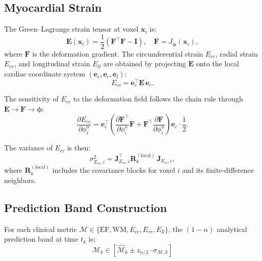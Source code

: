 \documentclass[10pt,twocolumn]{article}
\begin{document}
\subsection{Myocardial Strain}

The Green--Lagrange strain tensor at voxel $\bm{x}_i$ is:
\begin{equation}
    \bm{E}(\bm{x}_i) = \frac{1}{2}\left(\bm{F}^\top \bm{F} - \bm{I}\right), \quad \bm{F} = J_{\bm{\phi}}(\bm{x}_i),
    \label{eq:strain_def}
\end{equation}
where $\bm{F}$ is the deformation gradient. The circumferential strain $E_{cc}$, radial strain $E_{rr}$, and longitudinal strain $E_{ll}$ are obtained by projecting $\bm{E}$ onto the local cardiac coordinate system $(\bm{e}_c, \bm{e}_r, \bm{e}_l)$:
\begin{equation}
    E_{cc} = \bm{e}_c^\top \bm{E} \, \bm{e}_c.
    \label{eq:circ_strain}
\end{equation}

The sensitivity of $E_{cc}$ to the deformation field follows the chain rule through $\bm{E} \to \bm{F} \to \bm{\phi}$:
\begin{equation}
    \frac{\partial E_{cc}}{\partial \phi^a_i} = \bm{e}_c^\top \left(\frac{\partial \bm{F}^\top}{\partial \phi^a_i}\bm{F} + \bm{F}^\top \frac{\partial \bm{F}}{\partial \phi^a_i}\right) \bm{e}_c \cdot \frac{1}{2}.
    \label{eq:strain_sensitivity}
\end{equation}

The variance of $E_{cc}$ is then:
\begin{equation}
    \sigma^2_{E_{cc},i} = \bm{J}_{E_{cc},i}^\top \bm{R}_k^{(\text{local})} \, \bm{J}_{E_{cc},i},
    \label{eq:strain_var}
\end{equation}
where $\bm{R}_k^{(\text{local})}$ includes the covariance blocks for voxel $i$ and its finite-difference neighbors.

\subsection{Prediction Band Construction}

For each clinical metric $\mathcal{M} \in \{\text{EF}, \text{WM}, E_{cc}, E_{rr}, E_{ll}\}$, the $(1-\alpha)$ analytical prediction band at time $t_k$ is:
\begin{equation}
    \boxed{\mathcal{M}_k \in \left[\hat{\mathcal{M}}_k \pm z_{\alpha/2} \cdot \sigma_{\mathcal{M},k}\right]}
    \label{eq:final_band}
\end{equation}
\end{document}
